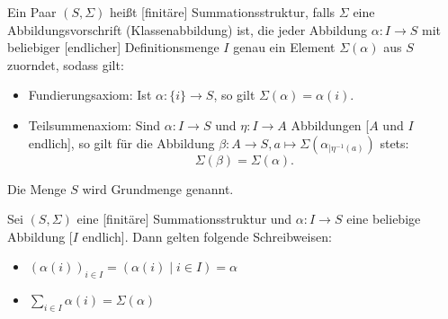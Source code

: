\documentclass{article}
\begin{document}
\begin{definition}
  Ein Paar $(S, \Sigma)$ heißt [finitäre] Summationsstruktur, falls $\Sigma$ eine Abbildungsvorschrift
  (Klassenabbildung) ist, die jeder Abbildung $\alpha \colon I \to S$ mit beliebiger [endlicher] Definitionsmenge $I$ 
  genau ein Element $\Sigma(\alpha)$ aus $S$ zuorndet, sodass gilt:
  \begin{itemize}
    \item Fundierungsaxiom: Ist $\alpha \colon \{ i \} \to S$, so gilt $\Sigma(\alpha) = \alpha(i)$.
    \item Teilsummenaxiom: Sind $\alpha \colon I \to S$ und $\eta \colon I \to A$ Abbildungen [$A$ und $I$ endlich],
          so gilt für die Abbildung $\beta \colon A \to S, a \mapsto \Sigma(\alpha_{\mid \eta^{-1}(a)})$
          stets: 
          \begin{equation*}
            \Sigma(\beta) = \Sigma(\alpha).
          \end{equation*}
  \end{itemize}
  Die Menge $S$ wird Grundmenge genannt.
\end{definition}

\begin{definition}
  Sei $(S, \Sigma)$ eine [finitäre] Summationsstruktur und ${\alpha \colon I \to S}$
  eine beliebige Abbildung [$I$ endlich]. 
  Dann gelten folgende Schreibweisen:
  \begin{itemize}
    \item $(\alpha(i))_{i \in I} = (\alpha(i) \mid i \in I) = \alpha$
    \item $\sum_{i \in I} \alpha(i) = \Sigma(\alpha)$
  \end{itemize}
\end{definition}
\end{document}
